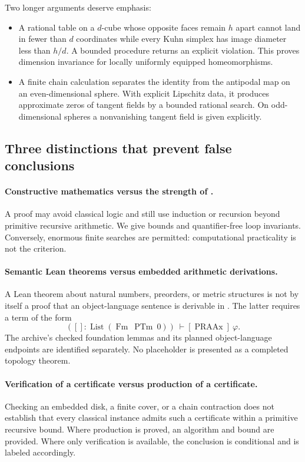 Two longer arguments deserve emphasis:
\begin{itemize}
\item A rational table on a $d$-cube whose opposite faces remain $h$ apart cannot land in fewer than $d$ coordinates while every Kuhn simplex has image diameter less than $h/d$. A bounded procedure returns an explicit violation. This proves dimension invariance for locally uniformly equipped homeomorphisms.
\item A finite chain calculation separates the identity from the antipodal map on an even-dimensional sphere. With explicit Lipschitz data, it produces approximate zeros of tangent fields by a bounded rational search. On odd-dimensional spheres a nonvanishing tangent field is given explicitly.
\end{itemize}

\subsection{Three distinctions that prevent false conclusions}

\paragraph{Constructive mathematics versus the strength of \ipra.}
A proof may avoid classical logic and still use induction or recursion beyond primitive recursive arithmetic. We give bounds and quantifier-free loop invariants. Conversely, enormous finite searches are permitted: computational practicality is not the criterion.

\paragraph{Semantic Lean theorems versus embedded arithmetic derivations.}
A Lean theorem about natural numbers, preorders, or metric structures is not by itself a proof that an object-language sentence is derivable in \ipra. The latter requires a term of the form
\[
([]:\operatorname{List}(\operatorname{Fm}\ \operatorname{PTm}\ 0))
 \ \vdash[\operatorname{PRAAx}]\ \varphi.
\]
The archive's checked foundation lemmas and its planned object-language endpoints are identified separately. No placeholder is presented as a completed topology theorem.

\paragraph{Verification of a certificate versus production of a certificate.}
Checking an embedded disk, a finite cover, or a chain contraction does not establish that every classical instance admits such a certificate within a primitive recursive bound. Where production is proved, an algorithm and bound are provided. Where only verification is available, the conclusion is conditional and is labeled accordingly.

